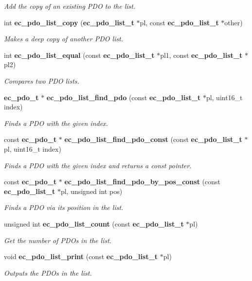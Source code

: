 \begin{DoxyCompactItemize}
\begin{DoxyCompactList}\small\item\em \-Add the copy of an existing \-P\-D\-O to the list. \end{DoxyCompactList}\item 
int {\bf ec\-\_\-pdo\-\_\-list\-\_\-copy} ({\bf ec\-\_\-pdo\-\_\-list\-\_\-t} $\ast$pl, const {\bf ec\-\_\-pdo\-\_\-list\-\_\-t} $\ast$other)
\begin{DoxyCompactList}\small\item\em \-Makes a deep copy of another \-P\-D\-O list. \end{DoxyCompactList}\item 
int {\bf ec\-\_\-pdo\-\_\-list\-\_\-equal} (const {\bf ec\-\_\-pdo\-\_\-list\-\_\-t} $\ast$pl1, const {\bf ec\-\_\-pdo\-\_\-list\-\_\-t} $\ast$pl2)
\begin{DoxyCompactList}\small\item\em \-Compares two \-P\-D\-O lists. \end{DoxyCompactList}\item 
{\bf ec\-\_\-pdo\-\_\-t} $\ast$ {\bf ec\-\_\-pdo\-\_\-list\-\_\-find\-\_\-pdo} (const {\bf ec\-\_\-pdo\-\_\-list\-\_\-t} $\ast$pl, uint16\-\_\-t index)
\begin{DoxyCompactList}\small\item\em \-Finds a \-P\-D\-O with the given index. \end{DoxyCompactList}\item 
const {\bf ec\-\_\-pdo\-\_\-t} $\ast$ {\bf ec\-\_\-pdo\-\_\-list\-\_\-find\-\_\-pdo\-\_\-const} (const {\bf ec\-\_\-pdo\-\_\-list\-\_\-t} $\ast$pl, uint16\-\_\-t index)
\begin{DoxyCompactList}\small\item\em \-Finds a \-P\-D\-O with the given index and returns a const pointer. \end{DoxyCompactList}\item 
const {\bf ec\-\_\-pdo\-\_\-t} $\ast$ {\bf ec\-\_\-pdo\-\_\-list\-\_\-find\-\_\-pdo\-\_\-by\-\_\-pos\-\_\-const} (const {\bf ec\-\_\-pdo\-\_\-list\-\_\-t} $\ast$pl, unsigned int pos)
\begin{DoxyCompactList}\small\item\em \-Finds a \-P\-D\-O via its position in the list. \end{DoxyCompactList}\item 
unsigned int {\bf ec\-\_\-pdo\-\_\-list\-\_\-count} (const {\bf ec\-\_\-pdo\-\_\-list\-\_\-t} $\ast$pl)
\begin{DoxyCompactList}\small\item\em \-Get the number of \-P\-D\-Os in the list. \end{DoxyCompactList}\item 
void {\bf ec\-\_\-pdo\-\_\-list\-\_\-print} (const {\bf ec\-\_\-pdo\-\_\-list\-\_\-t} $\ast$pl)
\begin{DoxyCompactList}\small\item\em \-Outputs the \-P\-D\-Os in the list. \end{DoxyCompactList}\end{DoxyCompactItemize}


